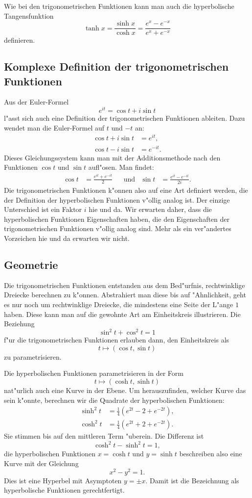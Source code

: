 Wie bei den trigonometrischen Funktionen kann man auch die hyperbolische
Tangensfunktion 
\begin{equation}
\tanh x
=
\frac{\sinh x}{\cosh x}
=
\frac{e^x - e^{-x}}{e^x + e^{-x}}
\label{skript:sinh:tanh}
\end{equation}
definieren.

\subsection{Komplexe Definition der trigonometrischen Funktionen}
Aus der Euler-Formel
\[
e^{it}=\cos t+i\sin t
\]
l"asst sich auch eine Definition der trigonometrischen Funktionen
ableiten. Dazu wendet man die Euler-Formel auf $t$ und $-t$ an:
\begin{align*}
\cos t+i\sin t&=e^{it},\\
\cos t-i\sin t&=e^{-it}.
\end{align*}
Dieses Gleichungssystem kann man mit der Additionsmethode nach den
Funktionen $\cos t$ und $\sin t$ aufl"osen. Man findet:
\[
\begin{aligned}
\cos t
&=
\frac{e^{it}+e^{-it}}2
&
&\text{und}
&
\sin t
&=
\frac{e^{it}-e^{-it}}{2i}.
\end{aligned}
\]
Die trigonometrischen Funktionen k"onnen also auf eine Art definiert werden,
die der Definition der hyperbolischen Funktionen v"ollig analog ist.
Der einzige Unterschied ist ein Faktor $i$ hie und da.
Wir erwarten daher, dass die hyperbolischen Funktionen Eigenschaften
haben, die den Eigenschaften der trigonometrischen Funktionen v"ollig
analog sind.
Mehr als ein ver"andertes Vorzeichen hie und da erwarten wir nicht.


\subsection{Geometrie}
Die trigonometrischen Funktionen entstanden aus dem Bed"urfnis, 
rechtwinklige Dreiecke berechnen zu k"onnen.
Abstrahiert man diese bis auf "Ahnlichkeit, geht es nur noch um rechtwinklige
Dreiecke, die mindestens eine Seite der L"ange $1$ haben.
Diese kann man auf die gewohnte Art am Einheitskreis illustrieren.
Die Beziehung 
\[
\sin^2t+\cos^2t=1
\]
f"ur die trigonometrischen Funktionen erlauben dann, den Einheitskreis als
\[
t\mapsto (\cos t,\sin t)
\]
zu parametrisieren.

Die hyperbolischen Funktionen parametrisieren in der Form
\[
t\mapsto (\cosh t, \sinh t)
\]
nat"urlich auch eine Kurve in der Ebene.
Um herauszufinden, welcher Kurve das sein k"onnte, berechnen wir die 
Quadrate der hyperbolischen Funktionen:
\begin{align}
\sinh^2 t&=\frac14(e^{2t}-2+e^{-2t}),
\\
\cosh^2 t&=\frac14(e^{2t}+2+e^{-2t}).
\label{hyp:definition}
\end{align}
Sie stimmen bis auf den mittleren Term "uberein.
Die Differenz ist 
\[
\cosh^2t - \sinh^2t=1,
\]
die hyperbolischen Funktionen $x=\cosh t$ und $y=\sinh t$
beschreiben also eine Kurve mit der Gleichung
\[
x^2-y^2=1.
\]
Dies ist eine Hyperbel mit Asymptoten $y=\pm x$. Damit ist die
Bezeichnung als hyperbolische Funktionen gerechtfertigt.

